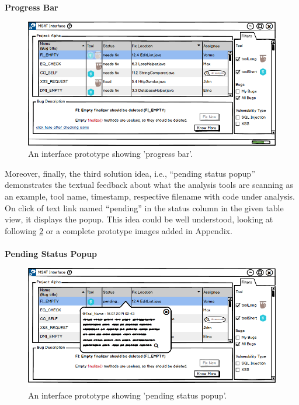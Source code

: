 \textbf{Progress Bar}
\begin{figure}[hbt!]
	\centering
	\includegraphics[width=\linewidth]{figures/solution_ideas_snaps/S12_disabled_icons_progress_bar}
	\caption{An interface prototype showing 'progress bar'.}
	\label{fig:S12_disabled_icons_progress_bar}
\end{figure}


Moreover, finally, the third solution idea, i.e., “pending status popup” demonstrates the textual feedback about what the analysis tools are scanning as an example, tool name, timestamp, respective filename with code under analysis. On click of text link named “pending” in the status column in the given table view, it displays the popup. This idea could be well understood, looking at following \ref{fig:S12_pending_status_popup} or a complete prototype images added in Appendix. \\ \\

\textbf{Pending Status Popup}
\begin{figure}[hbt!]
	\centering
	\includegraphics[width=\linewidth]{figures/solution_ideas_snaps/S12_pending_status_popup}
	\caption{An interface prototype showing 'pending status popup'.}
	\label{fig:S12_pending_status_popup}
\end{figure}

